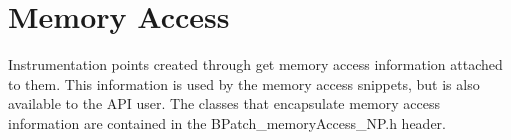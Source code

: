 \section{Memory Access}

Instrumentation points created through  get memory
access information attached to them. This information is used by the memory access snippets, but is also
available to the API user. The classes that encapsulate memory access information are contained in the
BPatch_memoryAccess_NP.h header.




